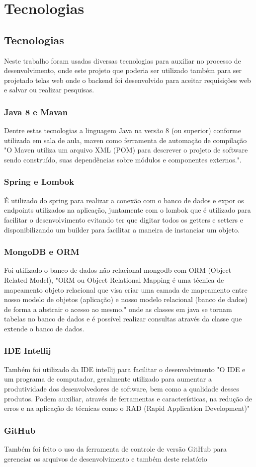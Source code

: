 \chapter{Tecnologias}\label{cap_tecnologias}

\section{Tecnologias}
Neste trabalho foram usadas diversas tecnologias para auxiliar no processo de desenvolvimento, onde este projeto que poderia ser utilizado também para ser projetado telas web onde o backend foi desenvolvido para aceitar requisições web e salvar ou realizar pesquisas. 

\subsection{Java 8 e Mavan}
Dentre estas tecnologias a linguagem Java na versão 8 (ou superior) conforme utilizada em sala de aula, maven como ferramenta de automação de compilação "O Maven utiliza um arquivo XML (POM) para descrever o projeto de software sendo construído, suas dependências sobre módulos e componentes externos."\cite{maven}. 

\subsection{Spring e Lombok}
É utilizado do spring para realizar a conexão com o banco de dados e expor os endpoints utilizados na aplicação, juntamente com o lombok que é utilizado para facilitar o desenvolvimento evitando ter que digitar todos os getters e setters e disponibilizando um builder para facilitar a maneira de instanciar um objeto.

\subsection{MongoDB e ORM}
Foi utilizado o banco de dados não relacional mongodb com ORM (Object Related Model), "ORM ou Object Relational Mapping é uma técnica de mapeamento objeto relacional que visa criar uma camada de mapeamento entre nosso modelo de objetos (aplicação) e nosso modelo relacional (banco de dados) de forma a abstrair o acesso ao mesmo."\cite{orm} onde as classes em java se tornam tabelas no banco de dados e é possível realizar consultas através da classe que extende o banco de dados.

\subsection{IDE Intellij}
Também foi utilizado da IDE intellij para facilitar o desenvolvimento "O IDE e um programa de computador, geralmente utilizado para aumentar a produtividade
dos desenvolvedores de software, bem como a qualidade desses produtos. Podem auxiliar,
através de ferramentas e características, na redução de erros e na aplicação de técnicas
como o RAD (Rapid Application Development)" \cite{ide}

\subsection{GitHub}
Também foi feito o uso da ferramenta de controle de versão GitHub para gerenciar os arquivos de desenvolvimento e também deste relatório

